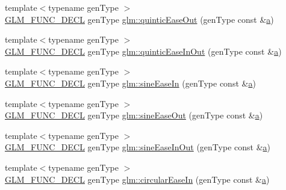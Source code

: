 \begin{DoxyCompactItemize}
\item 
{\footnotesize template$<$typename gen\+Type $>$ }\\\hyperlink{setup_8hpp_ab2d052de21a70539923e9bcbf6e83a51}{G\+L\+M\+\_\+\+F\+U\+N\+C\+\_\+\+D\+E\+CL} gen\+Type \hyperlink{group__gtx__easing_ga7dbd4d5c8da3f5353121f615e7b591d7}{glm\+::quintic\+Ease\+Out} (gen\+Type const \&\hyperlink{_s_d_l__opengl__glext_8h_a3309789fc188587d666cda5ece79cf82}{a})
\item 
{\footnotesize template$<$typename gen\+Type $>$ }\\\hyperlink{setup_8hpp_ab2d052de21a70539923e9bcbf6e83a51}{G\+L\+M\+\_\+\+F\+U\+N\+C\+\_\+\+D\+E\+CL} gen\+Type \hyperlink{group__gtx__easing_ga2a82d5c46df7e2d21cc0108eb7b83934}{glm\+::quintic\+Ease\+In\+Out} (gen\+Type const \&\hyperlink{_s_d_l__opengl__glext_8h_a3309789fc188587d666cda5ece79cf82}{a})
\item 
{\footnotesize template$<$typename gen\+Type $>$ }\\\hyperlink{setup_8hpp_ab2d052de21a70539923e9bcbf6e83a51}{G\+L\+M\+\_\+\+F\+U\+N\+C\+\_\+\+D\+E\+CL} gen\+Type \hyperlink{group__gtx__easing_gafb338ac6f6b2bcafee50e3dca5201dbf}{glm\+::sine\+Ease\+In} (gen\+Type const \&\hyperlink{_s_d_l__opengl__glext_8h_a3309789fc188587d666cda5ece79cf82}{a})
\item 
{\footnotesize template$<$typename gen\+Type $>$ }\\\hyperlink{setup_8hpp_ab2d052de21a70539923e9bcbf6e83a51}{G\+L\+M\+\_\+\+F\+U\+N\+C\+\_\+\+D\+E\+CL} gen\+Type \hyperlink{group__gtx__easing_gab3e454f883afc1606ef91363881bf5a3}{glm\+::sine\+Ease\+Out} (gen\+Type const \&\hyperlink{_s_d_l__opengl__glext_8h_a3309789fc188587d666cda5ece79cf82}{a})
\item 
{\footnotesize template$<$typename gen\+Type $>$ }\\\hyperlink{setup_8hpp_ab2d052de21a70539923e9bcbf6e83a51}{G\+L\+M\+\_\+\+F\+U\+N\+C\+\_\+\+D\+E\+CL} gen\+Type \hyperlink{group__gtx__easing_gaa46e3d5fbf7a15caa28eff9ef192d7c7}{glm\+::sine\+Ease\+In\+Out} (gen\+Type const \&\hyperlink{_s_d_l__opengl__glext_8h_a3309789fc188587d666cda5ece79cf82}{a})
\item 
{\footnotesize template$<$typename gen\+Type $>$ }\\\hyperlink{setup_8hpp_ab2d052de21a70539923e9bcbf6e83a51}{G\+L\+M\+\_\+\+F\+U\+N\+C\+\_\+\+D\+E\+CL} gen\+Type \hyperlink{group__gtx__easing_ga34508d4b204a321ec26d6086aa047997}{glm\+::circular\+Ease\+In} (gen\+Type const \&\hyperlink{_s_d_l__opengl__glext_8h_a3309789fc188587d666cda5ece79cf82}{a})

\end{DoxyCompactItemize}
